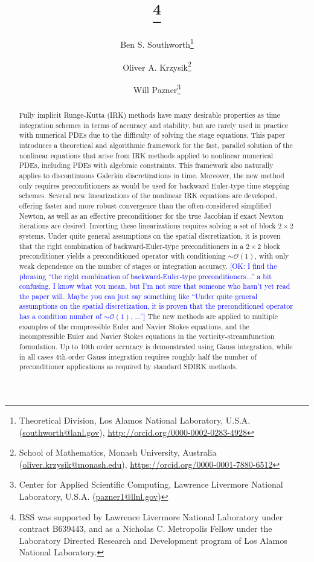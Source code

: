 \documentclass[review]{siamart}
\title{{\TheTitle}\thanks{BSS was supported by Lawrence Livermore National
      Laboratory under contract B639443, and as a Nicholas C. Metropolis Fellow
      under the Laboratory Directed Research and Development program of Los
      Alamos National Laboratory.
  }}
\author{Ben S. Southworth\thanks{Theoretical Division, Los Alamos National Laboratory,
    U.S.A. (\url{southworth@lanl.gov}),
    \url{http://orcid.org/0000-0002-0283-4928}}
    \and
    Oliver A. Krzysik\thanks{School of Mathematics, Monash University,
  	Australia (\url{oliver.krzysik@monash.edu}),
  	\url{https://orcid.org/0000-0001-7880-6512}}
  	\and
  	Will Pazner\thanks{Center for Applied Scientific Computing,
  	Lawrence Livermore National Laboratory,
    U.S.A. (\url{pazner1@llnl.gov})}
}
\newcommand{\OK}[1]{\textcolor{blue}{[OK: #1]}}
\begin{document}
\maketitle
\allowdisplaybreaks

\begin{abstract}
Fully implicit Runge-Kutta (IRK) methods have many desirable properties as time
integration schemes in terms of accuracy and stability, but are rarely used in
practice with numerical PDEs due to the difficulty of solving the stage equations.
This paper introduces a theoretical and algorithmic framework for the fast,
parallel solution of the nonlinear equations that arise from
IRK methods applied to nonlinear numerical PDEs, including PDEs with algebraic
constraints. This framework also naturally applies to discontinuous
Galerkin discretizations in time. Moreover, the new method only requires
preconditioners as would be used for backward Euler-type time stepping schemes.
Several new linearizations of the nonlinear IRK equations are developed,
offering faster and more robust convergence than the often-considered simplified
Newton, as well as an effective preconditioner for the true Jacobian if exact
Newton iterations are desired. Inverting these linearizations requires solving a
set of block $2\times 2$ systems. Under quite general assumptions on the
spatial discretization, it is proven that the right combination of
backward-Euler-type preconditioners in a $2\times 2$ block preconditioner yields
a preconditioned operator with conditioning $\sim\mathcal{O}(1)$, with only
weak dependence on the number of stages or integration accuracy. 
%
\OK{I find the phrasing ``the right combination of backward-Euler-type preconditioners...'' a bit confusing. I know what you mean, but I'm not sure that someone who hasn't yet read the paper will. Maybe you can just say something like ``Under quite general assumptions on the
spatial discretization, it is proven that the preconditioned operator has a condition number of $\sim\mathcal{O}(1)$, ...''} 
%
The new
methods are applied to multiple examples of the compressible Euler and Navier
Stokes equations, and the incompressible Euler and Navier Stokes equations
in the vorticity-streamfunction formulation. Up to 10th order accuracy is
demonstrated using Gauss integration, while in all cases 4th-order Gauss integration
requires roughly half the number of preconditioner applications as required
by standard SDIRK methods.
\end{abstract}


\end{document}
